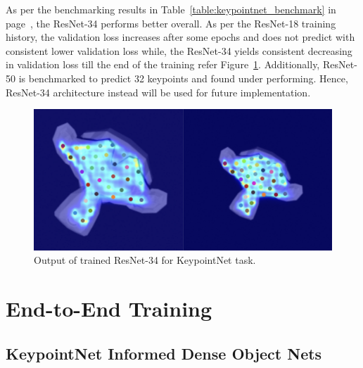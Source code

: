 As per the benchmarking results in Table~\ref{table:keypointnet_benchmark} in page~\pageref{table:keypointnet_benchmark}, the \ac{ResNet}-34 performs better overall.
As per the \ac{ResNet}-18 training history, the validation loss increases after some epochs and does not predict with consistent lower validation loss while, the \ac{ResNet}-34 yields consistent decreasing in
validation loss till the end of the training refer Figure~\ref{fig:output_keypointnet}.  Additionally, \ac{ResNet}-50 is benchmarked to predict 32 keypoints and found under performing. Hence, \ac{ResNet}-34 architecture instead will be used for future implementation.

\begin{figure}[htb]
    \centering
    \caption{Output of trained \ac{ResNet}-34 for KeypointNet task.}
    \label{fig:output_keypointnet}
    \includegraphics[scale=0.1]{images/keypointnet/output.png}
\end{figure}

\pagebreak





















\section{End-to-End Training}

\subsection{KeypointNet Informed Dense Object Nets}

